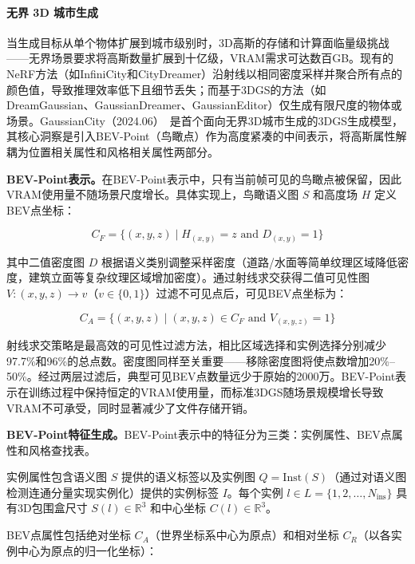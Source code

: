 \paragraph{无界 3D 城市生成}

当生成目标从单个物体扩展到城市级别时，3D高斯的存储和计算面临量级挑战——无界场景要求将高斯数量扩展到十亿级，VRAM需求可达数百GB。现有的NeRF方法（如InfiniCity和CityDreamer）沿射线以相同密度采样并聚合所有点的颜色值，导致推理效率低下且细节丢失；而基于3DGS的方法（如DreamGaussian、GaussianDreamer、GaussianEditor）仅生成有限尺度的物体或场景。GaussianCity（2024.06）~\cite{2406_06526}是首个面向无界3D城市生成的3DGS生成模型，其核心洞察是引入BEV-Point（鸟瞰点）作为高度紧凑的中间表示，将高斯属性解耦为位置相关属性和风格相关属性两部分。

\textbf{BEV-Point表示。}在BEV-Point表示中，只有当前帧可见的鸟瞰点被保留，因此VRAM使用量不随场景尺度增长。具体实现上，鸟瞰语义图 $S$ 和高度场 $H$ 定义BEV点坐标：

\begin{equation}
C_F = \{(x,y,z) \mid H_{(x,y)} = z \text{ and } D_{(x,y)} = 1\}
\end{equation}

其中二值密度图 $D$ 根据语义类别调整采样密度（道路/水面等简单纹理区域降低密度，建筑立面等复杂纹理区域增加密度）。通过射线求交获得二值可见性图 $V: (x,y,z) \to v$（$v \in \{0,1\}$）过滤不可见点后，可见BEV点坐标为：

\begin{equation}
C_A = \{(x,y,z) \mid (x,y,z) \in C_F \text{ and } V_{(x,y,z)} = 1\}
\end{equation}

射线求交策略是最高效的可见性过滤方法，相比区域选择和实例选择分别减少97.7\%和96\%的总点数。密度图同样至关重要——移除密度图将使点数增加20\%--50\%。经过两层过滤后，典型可见BEV点数量远少于原始的2000万。BEV-Point表示在训练过程中保持恒定的VRAM使用量，而标准3DGS随场景规模增长导致VRAM不可承受，同时显著减少了文件存储开销。

\textbf{BEV-Point特征生成。}BEV-Point表示中的特征分为三类：实例属性、BEV点属性和风格查找表。

实例属性包含语义图 $S$ 提供的语义标签以及实例图 $Q = \text{Inst}(S)$（通过对语义图检测连通分量实现实例化）提供的实例标签 $I$。每个实例 $l \in L = \{1, 2, \ldots, N_{\text{ins}}\}$ 具有3D包围盒尺寸 $S(l) \in \mathbb{R}^3$ 和中心坐标 $C(l) \in \mathbb{R}^3$。

BEV点属性包括绝对坐标 $C_A$（世界坐标系中心为原点）和相对坐标 $C_R$（以各实例中心为原点的归一化坐标）：

